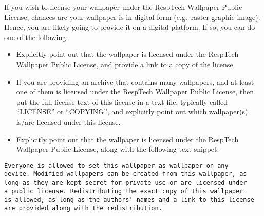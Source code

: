 \documentclass[]{article}
\providecommand{\tightlist}{%
  \setlength{\itemsep}{0pt}\setlength{\parskip}{0pt}}
\begin{document}
If you wish to license your wallpaper under the RespTech Wallpaper
Public License, chances are your wallpaper is in digital form
(e.g.~raster graphic image). Hence, you are likely going to provide it
on a digital platform. If so, you can do one of the following:

\begin{itemize}
\tightlist
\item
  Explicitly point out that the wallpaper is licensed under the RespTech
  Wallpaper Public License, and provide a link to a copy of the license.
\item
  If you are providing an archive that contains many wallpapers, and at
  least one of them is licensed under the RespTech Wallpaper Public
  License, then put the full license text of this license in a text
  file, typically called ``LICENSE'' or ``COPYING'', and explicitly
  point out which wallpaper(s) is/are licensed under this license.
\item
  Explicitly point out that the wallpaper is licensed under the RespTech
  Wallpaper Public License, along with the following text snippet:
\end{itemize}

\begin{verbatim}
Everyone is allowed to set this wallpaper as wallpaper on any
device. Modified wallpapers can be created from this wallpaper, as
long as they are kept secret for private use or are licensed under
a public license. Redistributing the exact copy of this wallpaper
is allowed, as long as the authors' names and a link to this license
are provided along with the redistribution.
\end{verbatim}
\end{document}
